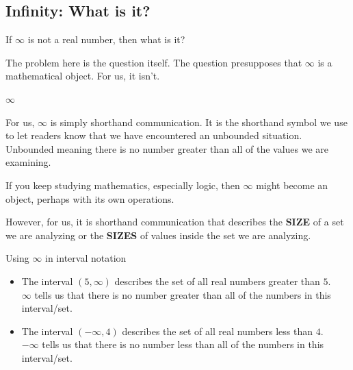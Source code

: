 \documentclass{ximera}
\begin{document}
\subsection*{Infinity: What is it?}


If $\infty$ is not a real number, then what is it?


The problem here is the question itself.  The question presupposes that $\infty$ is a mathematical object.  For us, it isn't.   


\begin{definition} \textbf{\textcolor{green!50!black}{$\infty$}}

For us, $\infty$ is simply shorthand communication.  It is the shorthand symbol we use to let readers know that we have encountered an unbounded situation. Unbounded meaning there is no number greater than all of the values we are examining.

\end{definition}

If you keep studying mathematics, especially logic, then $\infty$ might become an object, perhaps with its own operations.

However, for us, it is shorthand communication that describes the \textbf{SIZE} of a set we are analyzing or the \textbf{SIZES} of values inside the set we are analyzing.







\begin{example} Using $\infty$ in interval notation



\begin{itemize}
\item The interval $(5, \infty)$ describes the set of all real numbers greater than $5$.  \\
$\infty$ tells us that there is no number greater than all of the numbers in this interval/set.



\item The interval $(-\infty, 4)$ describes the set of all real numbers less than $4$.  \\
$-\infty$ tells us that there is no number less than all of the numbers in this interval/set.
\end{itemize}




\end{example}
\end{document}
